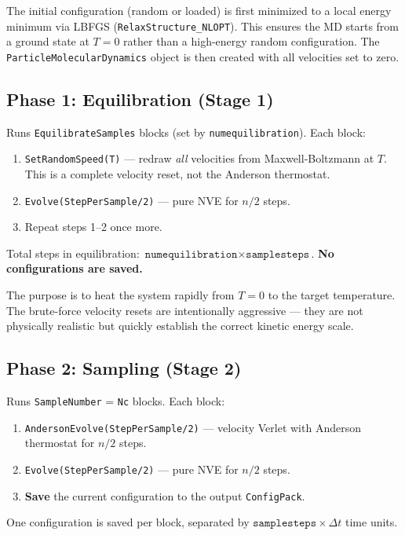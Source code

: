 \documentclass[12pt,a4paper]{article}
\begin{document}
The initial configuration (random or loaded) is first minimized to a
local energy minimum via LBFGS (\texttt{RelaxStructure\_NLOPT}).
This ensures the MD starts from a ground state at $T=0$ rather than
a high-energy random configuration. The \texttt{ParticleMolecularDynamics}
object is then created with all velocities set to zero.

\subsection{Phase 1: Equilibration (Stage 1)}

Runs \texttt{EquilibrateSamples} blocks (set by \texttt{numequilibration}).
Each block:
\begin{enumerate}
    \item \texttt{SetRandomSpeed(T)} --- redraw \emph{all} velocities from
          Maxwell-Boltzmann at $T$. This is a complete velocity reset,
          not the Anderson thermostat.
    \item \texttt{Evolve(StepPerSample/2)} --- pure NVE for $n/2$ steps.
    \item Repeat steps 1--2 once more.
\end{enumerate}

Total steps in equilibration: $\texttt{numequilibration} \times \texttt{samplesteps}$.
\textbf{No configurations are saved.}

The purpose is to heat the system rapidly from $T=0$ to the target
temperature. The brute-force velocity resets are intentionally aggressive ---
they are not physically realistic but quickly establish the correct
kinetic energy scale.

\subsection{Phase 2: Sampling (Stage 2)}

Runs \texttt{SampleNumber} = \texttt{Nc} blocks.
Each block:
\begin{enumerate}
    \item \texttt{AndersonEvolve(StepPerSample/2)} --- velocity Verlet
          with Anderson thermostat for $n/2$ steps.
    \item \texttt{Evolve(StepPerSample/2)} --- pure NVE for $n/2$ steps.
    \item \textbf{Save} the current configuration to the output
          \texttt{ConfigPack}.
\end{enumerate}

One configuration is saved per block, separated by
$\texttt{samplesteps} \times \Delta t$ time units.
\end{document}

